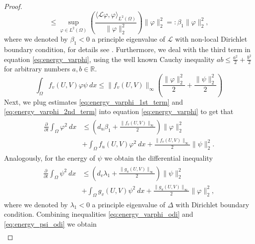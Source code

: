 \documentclass[12pt, a4paper]{article}
\theoremstyle{break}
\theoremstyle{break}
\theoremstyle{break}
\theoremstyle{break}
\theoremstyle{break}
\theoremstyle{break}
\theoremstyle{break}
\begin{document}
\begin{proof}
\begin{equation}
        \leq
        \sup_{\varphi \in L^2(\Omega)}\left( \frac{\langle \mathcal{L}\varphi, \varphi \rangle_{L^2(\Omega)}}{\|\varphi\|^2_2} \right) \|\varphi\|_2^2 =: \beta_1 \|\varphi\|_2^2,
    \end{equation}
    where we denoted by $\beta_1 < 0$ a principle eigenvalue of $\mathcal{L}$ with non-local Dirichlet boundary condition, for details see \cite{GarciaMelianRossi2009}. Furthermore, we deal with the third term in equation \eqref{eq:energy_varphi}, using the well known Cauchy inequality $ab \leq \frac{a^2}{2} + \frac{b^2}{2}$ for arbitrary numbers $a, b \in \mathbb{R}$.
    \begin{equation}
        \label{eq:energy_varphi_2nd_term}
        \int_\Omega f_v(U,V) \varphi \psi \:dx \leq \|f_v(U,V)\|_\infty \left( \frac{\|\varphi\|_2^2}{2} + \frac{\|\psi\|_2^2}{2} \right)
    \end{equation}
    Next, we plug estimates \eqref{eq:energy_varphi_1st_term} and \eqref{eq:energy_varphi_2nd_term} into equation \eqref{eq:energy_varphi} to get that
    \begin{align}
        \label{eq:energy_varphi_odi}
        \begin{split}
            \frac{\partial}{\partial t} \int_\Omega \varphi^2\:dx
            &\leq
            \left(d_u \beta_1 + \frac{\|f_v(U,V)\|_\infty}{2}\right) \|\varphi\|_2^2 \\
            &+
            \int_\Omega f_u(U,V) \varphi^2\:dx + 
            \frac{\|f_v(U,V)\|_\infty}{2}\|\psi\|_2^2.
        \end{split}
    \end{align}
    Analogously, for the energy of $\psi$ we obtain the differential inequality
    \begin{align}
        \label{eq:energy_psi_odi}
        \begin{split}
            \frac{\partial}{\partial t} \int_\Omega \psi^2\:dx
            &\leq
            \left(d_v \lambda_1 + \frac{\|g_u(U,V)\|_\infty}{2} \right) \|\psi\|_2^2 \\
            &+
            \int_\Omega g_v(U,V) \psi^2 \:dx + \frac{\|g_u(U,V)\|_\infty}{2} \|\varphi\|_2^2,
        \end{split}
    \end{align}
    where we denoted by $\lambda_1 < 0$ a principle eigenvalue of $\Delta$ with Dirichlet boundary condition. Combining inequalities \eqref{eq:energy_varphi_odi} and \eqref{eq:energy_psi_odi} we obtain
    \begin{align}

\end{align}
\end{proof}
\end{document}
